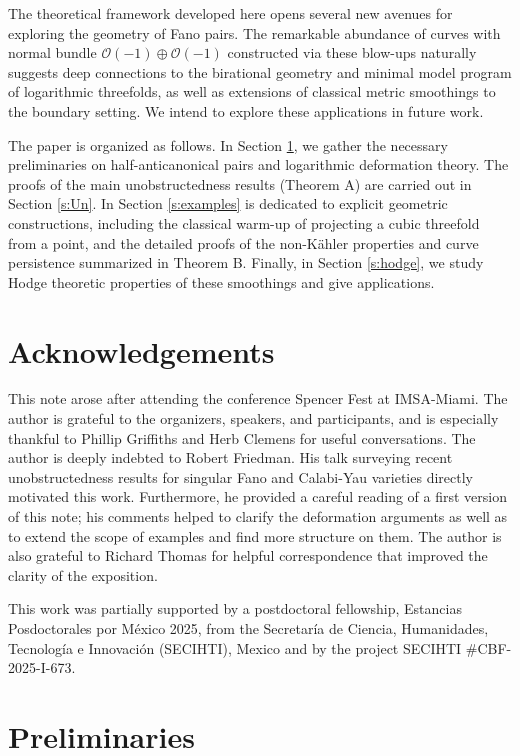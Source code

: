 \documentclass[11pt]{article}
\theoremstyle{definition}
\newcommand{\OO}{\mathcal{O}}
\begin{document}
The theoretical framework developed here opens several new avenues for exploring the geometry of Fano pairs. The remarkable abundance of curves with normal bundle $\OO(-1)\oplus \OO(-1)$ constructed via these blow-ups naturally suggests deep connections to the birational geometry and minimal model program of logarithmic threefolds, as well as extensions of classical metric smoothings to the boundary setting. We intend to explore these applications in future work.

The paper is organized as follows. In Section \ref{s:prel}, we gather the necessary preliminaries on half-anticanonical pairs and logarithmic deformation theory. The proofs of the main unobstructedness results (Theorem A) are carried out in Section \ref{s:Un}. In Section \ref{s:examples} is dedicated to explicit geometric constructions, including the classical warm-up of projecting a cubic threefold from a point, and the detailed proofs of the non-K\"ahler properties and curve persistence summarized in Theorem B. Finally, in Section \ref{s:hodge}, we study Hodge theoretic properties of these smoothings and give applications.

\section*{Acknowledgements} 
This note arose after attending the conference Spencer Fest at IMSA-Miami. The author is grateful to the organizers, speakers, and participants, and is especially thankful to Phillip Griffiths and Herb Clemens for useful conversations. The author is deeply indebted to Robert Friedman. His talk surveying recent unobstructedness results for singular Fano and Calabi-Yau varieties directly motivated this work. Furthermore, he provided a careful reading of a first version of this note; his comments helped to clarify the deformation arguments as well as to extend the scope of examples and find more structure on them.
The author is also grateful to Richard Thomas for helpful correspondence that improved the clarity of the exposition.

This work was partially supported by a postdoctoral fellowship, Estancias Posdoctorales por México 2025, from the Secretaría de Ciencia, Humanidades, Tecnología e Innovación (SECIHTI), Mexico and by the project SECIHTI \#CBF-2025-I-673.



\section{Preliminaries}\label{s:prel}
\end{document}
